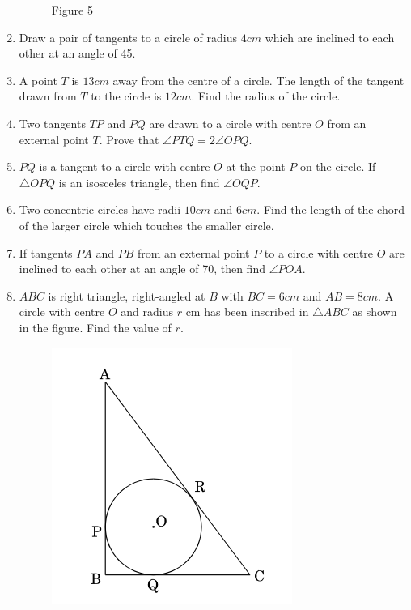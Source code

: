 \documentclass{article}
\begin{document}
\begin{enumerate}
\begin{figure}[!htb]
		\caption{Figure 5}
		\label{fig:my_label}
	\end{figure}
	\item Draw a pair of tangents to a circle of radius $4 cm$ which are inclined to each other at an angle of 45\degree.	
	\item A point $T$ is $13 cm$ away from the centre of a circle. The length of the tangent drawn from $T$ to the circle is $12 cm$. Find the radius of the circle.
	\item Two tangents $TP$ and $PQ$ are drawn to a circle with centre $O$ from an external point $T$. Prove that $\angle PTQ = 2 \angle OPQ$.
	\item $PQ$ is a tangent to a circle with centre $O$ at the point $P$ on the circle. If $\triangle OPQ$ is an isosceles triangle, then find $\angle OQP$.
	\item Two concentric circles have radii $10 cm$ and $6 cm$. Find the length of the chord of the larger circle which touches the smaller circle.
	\item If tangents $PA$ and $PB$ from an external point $P$ to a circle with centre $O$ are inclined to each other at an angle of 70\degree, then find $\angle POA$.
	\item $ABC$ is right triangle, right-angled at $B$ with $BC = 6 cm$ and $AB = 8 cm$. A circle with centre $O$ and radius $r$ cm has been inscribed in $\triangle ABC$ as shown in the figure. Find the value of $r$.
		\begin{figure}[h]
			\centering
			\includegraphics[width=\columnwidth]{fig2.png}

\end{figure}
\end{enumerate}
\end{document}

